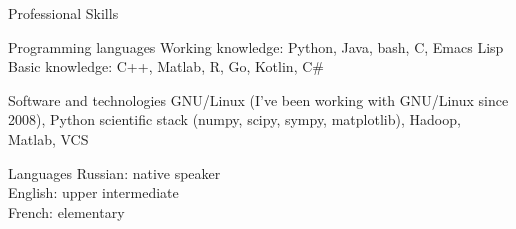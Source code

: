 \documentclass{resume}
\begin{document}
\begin{rSection}{Professional Skills}
  \begin{rSubsection}{Programming languages}{}{}
    Working knowledge: Python, Java, bash, C, Emacs Lisp \\
    Basic knowledge: C++, Matlab, R, Go, Kotlin, C\#
  \end{rSubsection}

  \begin{rSubsection}{Software and technologies}{}{}
    GNU/Linux (I've been working with GNU/Linux since 2008), Python scientific stack (numpy, scipy, sympy, matplotlib), Hadoop, Matlab, VCS
  \end{rSubsection}

  \begin{rSubsection}{Languages}{}{}
    Russian: native speaker \\
    English: upper intermediate \\
    French: elementary
  \end{rSubsection}
\end{rSection}
\end{document}
